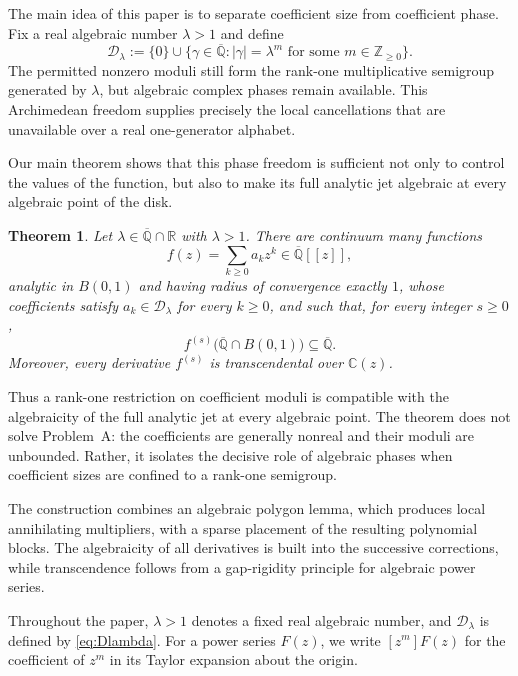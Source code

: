 \documentclass[10pt,a4paper]{amsart}
\newtheorem{theorem}{Theorem}[section]
\numberwithin{equation}{section}
\newcommand{\Z}{\mathbb Z}
\newcommand{\R}{\mathbb R}
\newcommand{\C}{\mathbb C}
\newcommand{\Qbar}{\overline{\mathbb Q}}
\newcommand{\D}{\mathcal D}
\newcommand{\abs}[1]{\lvert #1\rvert}
\newcommand{\B}{B(0,1)}
\begin{document}
The main idea of this paper is to separate coefficient size from coefficient
phase. Fix a real algebraic number $\lambda>1$ and define
\begin{equation}\label{eq:Dlambda}
        \D_\lambda
        :=\{0\}\cup
        \bigl\{\gamma\in\Qbar:\abs{\gamma}=\lambda^m
        \text{ for some }m\in\Z_{\geq0}\bigr\}.
\end{equation}
The permitted nonzero moduli still form the rank-one multiplicative
semigroup generated by $\lambda$, but algebraic complex phases remain
available. This Archimedean freedom supplies precisely the local
cancellations that are unavailable over a real one-generator alphabet.

Our main theorem shows that this phase freedom is sufficient not only to
control the values of the function, but also to make its full analytic jet
algebraic at every algebraic point of the disk.


\begin{theorem}\label{theorem:main}
Let $\lambda\in\Qbar\cap\R$ with $\lambda>1$. There are continuum many functions
\[
        f(z)=\sum_{k\geq0}a_kz^k\in\Qbar[[z]],
\]
analytic in $\B$ and having radius of convergence exactly $1$, whose
coefficients satisfy $a_k\in\D_\lambda$ for every $k\geq0$, and such that,
for every integer $s\geq0$,
\[
        f^{(s)}\bigl(\Qbar\cap\B\bigr)\subseteq\Qbar.
\]
Moreover, every derivative $f^{(s)}$ is transcendental over $\C(z)$.
\end{theorem}


Thus a rank-one restriction on coefficient moduli is compatible with the
algebraicity of the full analytic jet at every algebraic point. The theorem
does not solve Problem~A: the coefficients are generally nonreal and their
moduli are unbounded. Rather, it isolates the decisive role of algebraic
phases when coefficient sizes are confined to a rank-one semigroup.

The construction combines an algebraic polygon lemma, which produces local
annihilating multipliers, with a sparse placement of the resulting
polynomial blocks. The algebraicity of all derivatives is built into the
successive corrections, while transcendence follows from a gap-rigidity
principle for algebraic power series.

Throughout the paper, $\lambda>1$ denotes a fixed real algebraic number, and
$\D_\lambda$ is defined by \eqref{eq:Dlambda}. For a power series $F(z)$, we
write $[z^m]F(z)$ for the coefficient of $z^m$ in its Taylor expansion about
the origin.
\end{document}
